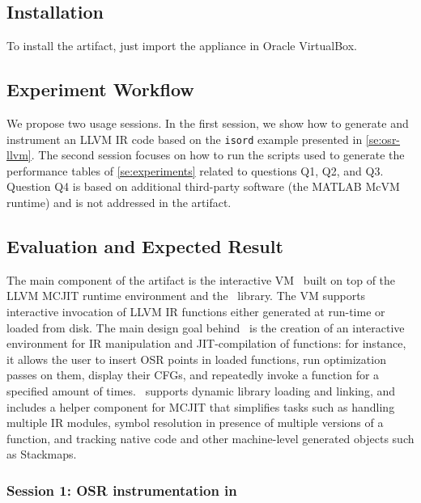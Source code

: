 \subsection{Installation}

To install the artifact, just import the appliance in Oracle VirtualBox.

\subsection{Experiment Workflow}

We propose two usage sessions. In the first session, we show how to generate and instrument an LLVM IR code based on the \texttt{isord} example presented in \mysection\ref{se:osr-llvm}. The second session focuses on how to run the scripts used to generate the performance tables of \mysection\ref{se:experiments} related to questions Q1, Q2, and Q3. Question Q4 is based on additional third-party software (the MATLAB McVM runtime) and is not addressed in the artifact.

\subsection{Evaluation and Expected Result}

The main component of the artifact is the interactive VM \tinyvm\ built on top of the LLVM MCJIT runtime environment and the \osrkit\ library. The VM supports interactive invocation of LLVM IR functions either generated at run-time or loaded from disk. The main design goal behind \tinyvm\ is the creation of an interactive environment for IR manipulation and JIT-compilation of functions: for instance, it allows the user to insert OSR points in loaded functions, run optimization passes on them, display their CFGs, and repeatedly invoke a function for a specified amount of times. \tinyvm\ supports dynamic library loading and linking, and includes a helper component for MCJIT that simplifies tasks such as handling multiple IR modules, symbol resolution in presence of multiple versions of a function, and tracking native code and other machine-level generated objects such as Stackmaps.

\subsubsection{Session 1: OSR instrumentation in \osrkit}

